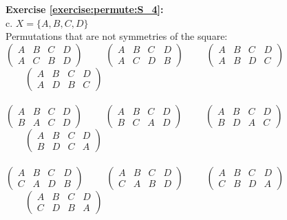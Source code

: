 \noindent\textbf{Exercise \ref{exercise:permute:S_4}:}\\
c. $X=\{A,B,C,D\}$\\
Permutations that are not symmetries of the square:\\
$\begin{pmatrix}
A & B & C & D\\
A & C & B & D
\end{pmatrix}$
$\qquad\begin{pmatrix}
A & B & C & D\\
A & C & D & B
\end{pmatrix}$
$\qquad\begin{pmatrix}
A & B & C & D\\
A & B & D & C
\end{pmatrix}$
$\qquad\begin{pmatrix}
A & B & C & D\\
A & D & B & C
\end{pmatrix}$\\
\\
$\begin{pmatrix}
A & B & C & D\\
B & A & C & D
\end{pmatrix}$
$\qquad\begin{pmatrix}
A & B & C & D\\
B & C & A & D
\end{pmatrix}$
$\qquad\begin{pmatrix}
A & B & C & D\\
B & D & A & C
\end{pmatrix}$
$\qquad\begin{pmatrix}
A & B & C & D\\
B & D & C & A
\end{pmatrix}$\\
\\
$\begin{pmatrix}
A & B & C & D\\
C & A & D & B
\end{pmatrix}$
$\qquad\begin{pmatrix}
A & B & C & D\\
C & A & B & D
\end{pmatrix}$
$\qquad\begin{pmatrix}
A & B & C & D\\
C & B & D & A
\end{pmatrix}$
$\qquad\begin{pmatrix}
A & B & C & D\\
C & D & B & A
\end{pmatrix}$\\
